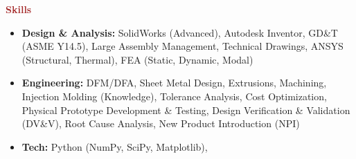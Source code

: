 \documentclass[11pt, letterpaper]{article}
\begin{document}
\noindent \textbf{\large \textcolor{Brown}{Skills}}\vspace{2pt}\\
\begin{itemize}[leftmargin=*, label=\textbullet]
\setlength\itemsep{-2pt}
\vspace{-8pt}
\item \textbf{Design \& Analysis:} SolidWorks (Advanced), Autodesk Inventor, GD\&T (ASME Y14.5), Large Assembly Management, Technical Drawings, ANSYS (Structural, Thermal), FEA (Static, Dynamic, Modal)
\item \textbf{Engineering:} DFM/DFA, Sheet Metal Design, Extrusions, Machining, Injection Molding (Knowledge), Tolerance Analysis, Cost Optimization, Physical Prototype Development \& Testing, Design Verification \& Validation (DV\&V), Root Cause Analysis, New Product Introduction (NPI)
\item \textbf{Tech:} Python (NumPy, SciPy, Matplotlib), 
\end{itemize}
\end{document}

